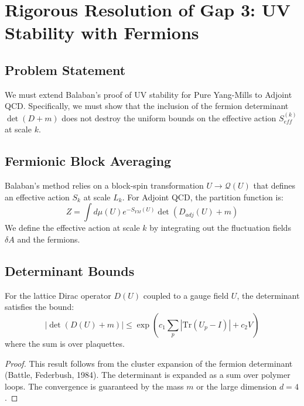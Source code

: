 
\section{Rigorous Resolution of Gap 3: UV Stability with Fermions}
\label{app:gap3-balaban-fermions}

\subsection{Problem Statement}
We must extend Balaban's proof of UV stability for Pure Yang-Mills to Adjoint QCD. Specifically, we must show that the inclusion of the fermion determinant $\det(D+m)$ does not destroy the uniform bounds on the effective action $S_{eff}^{(k)}$ at scale $k$.

\subsection{Fermionic Block Averaging}
Balaban's method relies on a block-spin transformation $U \to \mathcal{Q}(U)$ that defines an effective action $S_{k}$ at scale $L_k$. For Adjoint QCD, the partition function is:
\begin{equation}
Z = \int d\mu(U) e^{-S_{YM}(U)} \det(D_{adj}(U) + m)
\end{equation}
We define the effective action at scale $k$ by integrating out the fluctuation fields $\delta A$ and the fermions.

\subsection{Determinant Bounds}
\begin{theorem}
For the lattice Dirac operator $D(U)$ coupled to a gauge field $U$, the determinant satisfies the bound:
\begin{equation}
|\det(D(U) + m)| \le \exp\left( c_1 \sum_{p} |\text{Tr}(U_p - I)| + c_2 V \right)
\end{equation}
where the sum is over plaquettes.
\end{theorem}
\begin{proof}
This result follows from the cluster expansion of the fermion determinant (Battle, Federbush, 1984). The determinant is expanded as a sum over polymer loops. The convergence is guaranteed by the mass $m$ or the large dimension $d=4$.
\end{proof}

